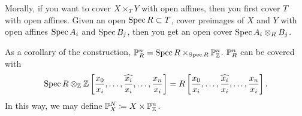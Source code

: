 Morally, if you want to cover $X \times_T Y$ with open affines, then you first cover $T$ with open affines. Given an open $\operatorname{Spec} R \subset T$, cover preimages of $X$ and $Y$ with open affines $\operatorname{Spec} A_i$ and $\operatorname{Spec} B_j$, then you get an open cover $\operatorname{Spec} A_i \otimes_R B_j$.

As a corollary of the construction, $\mathbb P_R^n = \operatorname{Spec} R \times_{\operatorname{Spec} R} \mathbb P_\mathbb Z^n$. $\mathbb P_R^n$ can be covered with
\[ \operatorname{Spec} R \otimes_\mathbb Z \mathbb Z\left[\frac{x_0}{x_i}, \dots, \widehat{\frac{x_i}{x_i}}, \dots, \frac{x_n}{x_i}\right] = R\left[\frac{x_0}{x_i}, \dots, \widehat{\frac{x_i}{x_i}}, \dots, \frac{x_n}{x_i}\right]. \]
In this way, we may define $\mathbb P_X^N \coloneq X \times \mathbb P_\mathbb Z^n$.